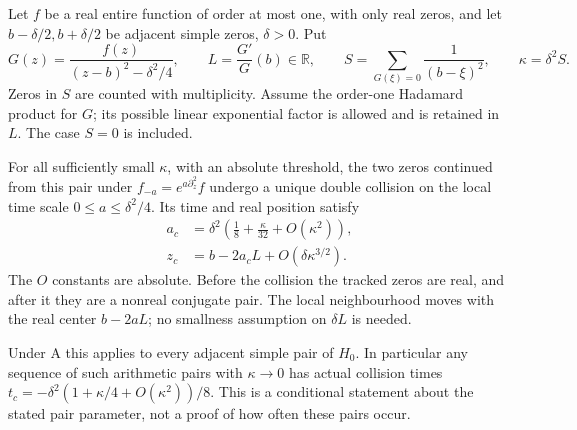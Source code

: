 \begin{theorem}
Let $f$ be a real entire function of order at most one, with
only real zeros, and let $b-\delta/2,b+\delta/2$ be adjacent
simple zeros, $\delta>0$. Put
\[
 G(z)=\frac{f(z)}{(z-b)^2-\delta^2/4},\qquad
 L=\frac{G'}G(b)\in\mathbb R,\qquad
 S=\sum_{G(\xi)=0}\frac1{(b-\xi)^2},\qquad
                       \kappa=\delta^2S.
\]
Zeros in $S$ are counted with multiplicity. Assume the
order-one Hadamard product for $G$; its possible linear
exponential factor is allowed and is retained in $L$.
The case $S=0$ is included.

For all sufficiently small $\kappa$, with an absolute
threshold, the two zeros continued from this pair under
$f_{-a}=e^{a\partial_z^2}f$ undergo a unique double collision
on the local time scale $0\le a\le\delta^2/4$. Its time and
real position satisfy
\begin{align}
 a_c&=\delta^2\left(\frac18+\frac{\kappa}{32}
                                      +O(\kappa^2)\right),
                        \label{eq:analytic-isolated-time}\\
 z_c&=b-2a_cL+O(\delta\kappa^{3/2}).
                        \label{eq:analytic-isolated-center}
\end{align}
The $O$ constants are absolute. Before the collision the
tracked zeros are real, and after it they are a nonreal
conjugate pair. The local neighbourhood moves with the real
center $b-2aL$; no smallness assumption on $\delta L$ is needed.

Under A this applies to every adjacent simple pair of $H_0$.
In particular any sequence of such arithmetic pairs with
$\kappa\to0$ has actual collision times
$t_c=-\delta^2(1+\kappa/4+O(\kappa^2))/8$.
This is a conditional statement about the stated pair
parameter, not a proof of how often these pairs occur.
\end{theorem}

